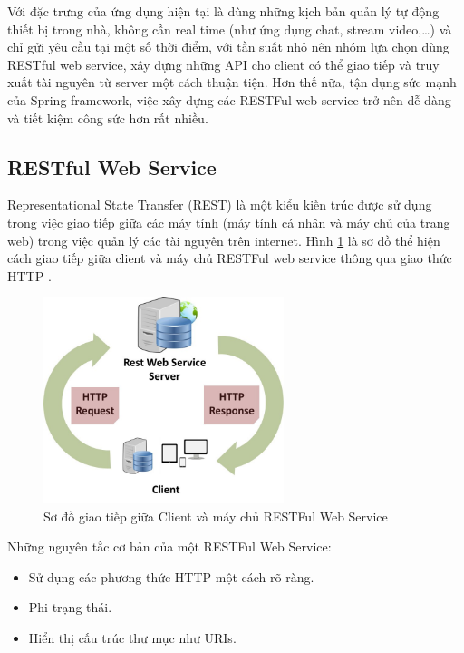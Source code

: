 \documentclass[12pt,a4paper,oneside]{extbook}
\begin{document}
\noindent
Với đặc trưng của ứng dụng hiện tại là dùng những kịch bản quản lý tự động thiết bị trong nhà, không cần real time (như ứng dụng chat, stream video,\dots) và chỉ gửi yêu cầu tại một số thời điểm, với tần suất nhỏ nên nhóm lựa chọn dùng RESTful web service, xây dựng những API cho client có thể giao tiếp và truy xuất tài nguyên từ server một cách thuận tiện. Hơn thế nữa, tận dụng sức mạnh của Spring framework, việc xây dựng các RESTFul web service trở nên dễ dàng và tiết kiệm công sức hơn rất nhiều.

\subsection{RESTful Web Service}

Representational State Transfer (REST) là một kiểu kiến trúc được sử dụng trong việc giao tiếp giữa các máy tính (máy tính cá nhân và máy chủ của trang web) trong việc quản lý các tài nguyên trên internet. Hình \ref{fig:3-client-communicate-RESTfulWS} là sơ đồ thể hiện cách giao tiếp giữa client và máy chủ RESTFul web service thông qua giao thức HTTP \cite{restful-basic}.

\begin{figure}[h]
  \centering
     \includegraphics[width=7cm]{3-client-communicate-RESTfulWS}
  \caption{Sơ đồ giao tiếp giữa Client và máy chủ RESTFul Web Service}\label{fig:3-client-communicate-RESTfulWS}
\end{figure}

\noindent
Những nguyên tắc cơ bản của một RESTFul Web Service:

\begin{itemize}[topsep=1mm,itemsep=-0.5mm]
\item Sử dụng các phương thức HTTP một cách rõ ràng.
\item Phi trạng thái.
\item Hiển thị cấu trúc thư mục như URIs.
\vspace{1mm}
\end{itemize}
\end{document}
